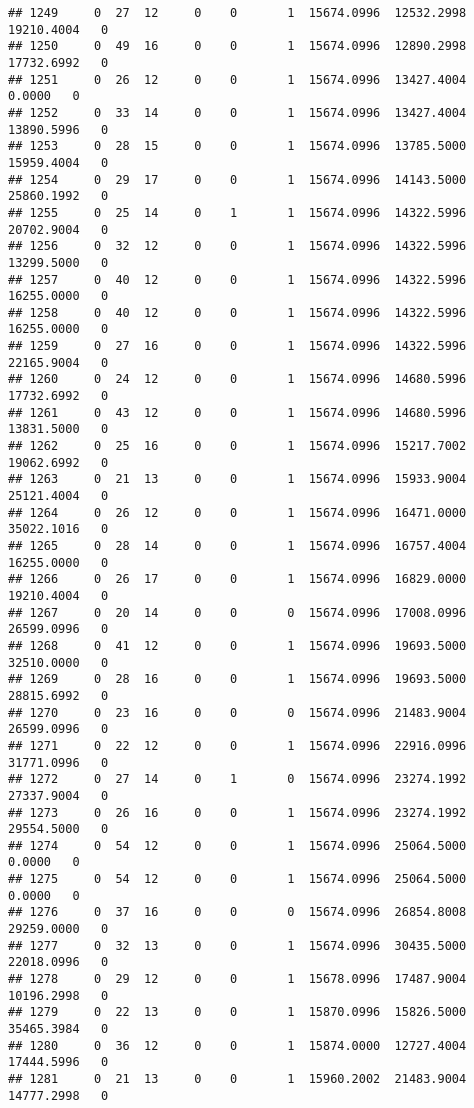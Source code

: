\documentclass[
]{article}
\begin{document}
\begin{enumerate}
\begin{verbatim}
## 1249     0  27  12     0    0       1  15674.0996  12532.2998  19210.4004   0
## 1250     0  49  16     0    0       1  15674.0996  12890.2998  17732.6992   0
## 1251     0  26  12     0    0       1  15674.0996  13427.4004      0.0000   0
## 1252     0  33  14     0    0       1  15674.0996  13427.4004  13890.5996   0
## 1253     0  28  15     0    0       1  15674.0996  13785.5000  15959.4004   0
## 1254     0  29  17     0    0       1  15674.0996  14143.5000  25860.1992   0
## 1255     0  25  14     0    1       1  15674.0996  14322.5996  20702.9004   0
## 1256     0  32  12     0    0       1  15674.0996  14322.5996  13299.5000   0
## 1257     0  40  12     0    0       1  15674.0996  14322.5996  16255.0000   0
## 1258     0  40  12     0    0       1  15674.0996  14322.5996  16255.0000   0
## 1259     0  27  16     0    0       1  15674.0996  14322.5996  22165.9004   0
## 1260     0  24  12     0    0       1  15674.0996  14680.5996  17732.6992   0
## 1261     0  43  12     0    0       1  15674.0996  14680.5996  13831.5000   0
## 1262     0  25  16     0    0       1  15674.0996  15217.7002  19062.6992   0
## 1263     0  21  13     0    0       1  15674.0996  15933.9004  25121.4004   0
## 1264     0  26  12     0    0       1  15674.0996  16471.0000  35022.1016   0
## 1265     0  28  14     0    0       1  15674.0996  16757.4004  16255.0000   0
## 1266     0  26  17     0    0       1  15674.0996  16829.0000  19210.4004   0
## 1267     0  20  14     0    0       0  15674.0996  17008.0996  26599.0996   0
## 1268     0  41  12     0    0       1  15674.0996  19693.5000  32510.0000   0
## 1269     0  28  16     0    0       1  15674.0996  19693.5000  28815.6992   0
## 1270     0  23  16     0    0       0  15674.0996  21483.9004  26599.0996   0
## 1271     0  22  12     0    0       1  15674.0996  22916.0996  31771.0996   0
## 1272     0  27  14     0    1       0  15674.0996  23274.1992  27337.9004   0
## 1273     0  26  16     0    0       1  15674.0996  23274.1992  29554.5000   0
## 1274     0  54  12     0    0       1  15674.0996  25064.5000      0.0000   0
## 1275     0  54  12     0    0       1  15674.0996  25064.5000      0.0000   0
## 1276     0  37  16     0    0       0  15674.0996  26854.8008  29259.0000   0
## 1277     0  32  13     0    0       1  15674.0996  30435.5000  22018.0996   0
## 1278     0  29  12     0    0       1  15678.0996  17487.9004  10196.2998   0
## 1279     0  22  13     0    0       1  15870.0996  15826.5000  35465.3984   0
## 1280     0  36  12     0    0       1  15874.0000  12727.4004  17444.5996   0
## 1281     0  21  13     0    0       1  15960.2002  21483.9004  14777.2998   0

\end{verbatim}
\end{enumerate}
\end{document}
